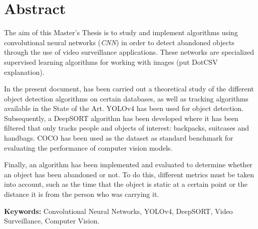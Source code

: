 
\chapter*{Abstract}
\label{cha:abstract}

\noindent
The aim of this Master's Thesis is to study and implement algorithms using convolutional neural networks (\textit{CNN}) in order to detect abandoned objects through the use of video surveillance applications. These networks are specialized supervised learning algorithms for working with images (put DotCSV explanation).

In the present document, has been carried out a theoretical study of the different object detection algorithms on certain databases, as well as tracking algorithms available in the State of the Art. YOLOv4 \cite{bochkovskiy2020yolov4} has been used for object detection. Subsequently, a DeepSORT algorithm \cite{Wojke2017simple} has been developed where it has been filtered that only tracks people and objects of interest: backpacks, suitcases and handbags. COCO \cite{lin2015microsoft} has been used as the dataset as standard benchmark for evaluating the performance of computer vision models.

Finally, an algorithm has been implemented and evaluated to determine whether an object has been abandoned or not. To do this, different metrics must be taken into account, such as the time that the object is static at a certain point or the distance it is from the person who was carrying it.

\textbf{Keywords:} Convolutional Neural Networks, YOLOv4, DeepSORT, Video Surveillance, Computer Vision.